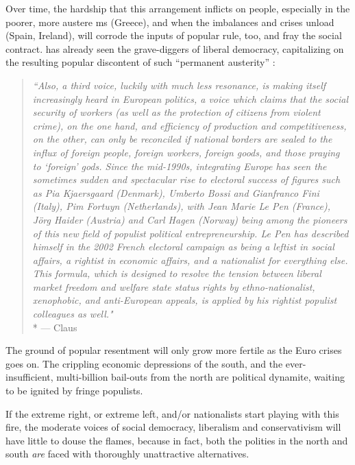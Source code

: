 Over time, the hardship that this arrangement inflicts on people, especially in the poorer, more austere \gls{ms} (Greece), and when the imbalances and crises unload (Spain, Ireland), will corrode the inputs of popular rule, too, and fray the social contract.
\citeauthor{Offe2003} has already seen the grave-diggers of liberal democracy, capitalizing on the resulting popular discontent of such ``permanent austerity'' \citep{StreeckMertens2010}:
\begin{quotation}
	\emph{``Also, a third voice, luckily with much less resonance, is making itself increasingly heard in European politics, a voice which claims that the social security of workers (as well as the protection of citizens from violent crime), on the one hand, and efficiency of production and competitiveness, on the other, can only be reconciled if national borders are sealed to the influx of foreign people, foreign workers, foreign goods, and those praying to `foreign' gods.
	Since the mid-1990s, integrating Europe has seen the sometimes sudden and spectacular rise to electoral success of figures such as Pia Kjaersgaard (Denmark), Umberto Bossi and Gianfranco Fini (Italy), Pim Fortuyn (Netherlands), with Jean Marie Le Pen (France), Jörg Haider (Austria) and Carl Hagen (Norway) being among the pioneers of this new field of populist political entrepreneurship.
	Le Pen has described himself in the 2002 French electoral campaign as being a leftist in social affairs, a rightist in economic affairs, and a nationalist for everything else.
	\\
	This formula, which is designed to resolve the tension between liberal market freedom and welfare state status rights by ethno-nationalist, xenophobic, and anti-European appeals, is applied by his rightist populist colleagues as well."}
	\\*
	--- Claus \citet[454]{Offe2003}
\end{quotation}

The ground of popular resentment will only grow more fertile as the Euro crises goes on.
The crippling economic depressions of the south, and the ever-insufficient, multi-billion bail-outs from the north are political dynamite, waiting to be ignited by fringe populists.

If the extreme right, or extreme left, and/or nationalists start playing with this fire, the moderate voices of social democracy, liberalism and conservativism will have little to douse the flames, because in fact, both the polities in the north and south \emph{are} faced with thoroughly unattractive alternatives.

